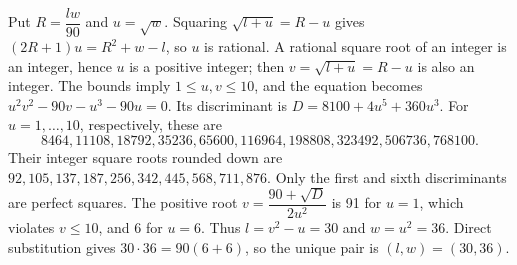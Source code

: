 Put $R=\dfrac{lw}{90}$ and $u=\sqrt w$. Squaring $\sqrt{l+u}=R-u$ gives $(2R+1)u=R^2+w-l$, so $u$ is rational. A rational square root of an integer is an integer, hence $u$ is a positive integer; then $v=\sqrt{l+u}=R-u$ is also an integer. The bounds imply $1\le u,v\le10$, and the equation becomes $u^2v^2-90v-u^3-90u=0$. Its discriminant is $D=8100+4u^5+360u^3$. For $u=1,\ldots,10$, respectively, these are
\[8464,11108,18792,35236,65600,116964,198808,323492,506736,768100.\]
Their integer square roots rounded down are $92,105,137,187,256,342,445,568,711,876$. Only the first and sixth discriminants are perfect squares. The positive root $v=\dfrac{90+\sqrt D}{2u^2}$ is 91 for $u=1$, which violates $v\le10$, and 6 for $u=6$. Thus $l=v^2-u=30$ and $w=u^2=36$. Direct substitution gives $30\cdot36=90(6+6)$, so the unique pair is $\boxed{(l,w)=(30,36)}$.
